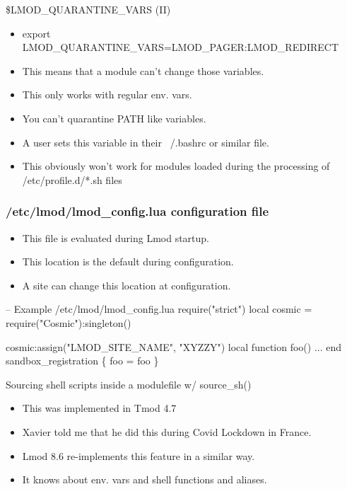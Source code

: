 \documentclass{beamer}
\begin{document}
\begin{frame}{\$LMOD\_QUARANTINE\_VARS (II)}
  \begin{itemize}
    \item export LMOD\_QUARANTINE\_VARS=LMOD\_PAGER:LMOD\_REDIRECT
    \item This means that a module can't change those variables.
    \item This only works with regular env. vars.
    \item You can't quarantine PATH like variables.
    \item A user sets this variable in their ~/.bashrc or similar
      file.
    \item This obviously won't work for modules loaded during the
      processing of /etc/profile.d/*.sh files
  \end{itemize}
\end{frame}

\begin{frame}[fragile]
  \frametitle{/etc/lmod/lmod\_config.lua configuration file}
  \begin{itemize}
    \item This file is evaluated during Lmod startup. 
    \item This location is the default during configuration.
    \item A site can change this location at configuration.
  \end{itemize}
    {\small
\begin{semiverbatim}
-- Example /etc/lmod/lmod\_config.lua
require("strict")
local cosmic = require("Cosmic"):singleton()

cosmic:assign("LMOD\_SITE\_NAME", "XYZZY")
local function foo()
  ...
end
sandbox\_registration \{ foo = foo \}
\end{semiverbatim}
}
\end{frame}

\begin{frame}{Sourcing shell scripts inside a modulefile w/ source\_sh()}
  \begin{itemize}
    \item This was implemented in Tmod 4.7
    \item Xavier told me that he did this during Covid Lockdown in France.
    \item Lmod 8.6 re-implements this feature in a similar way.
    \item It knows about env. vars and shell functions and aliases.
  \end{itemize}
\end{frame}
\end{document}
